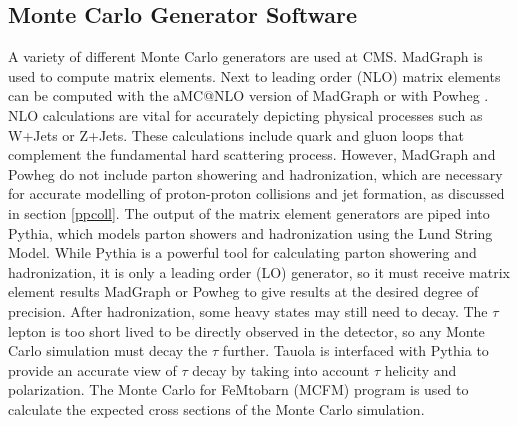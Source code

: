 \documentclass[oneside, letterpaper, oldfontcommands]{memoir}
\begin{document}

\subsection{Monte Carlo Generator Software}\label{mcsoftware}

\qquad A variety of different Monte Carlo generators are used at CMS. {\sc MadGraph} \cite{Alwall:2014hca} is used to compute matrix elements. Next to leading order (NLO) matrix elements can be computed with the aMC@NLO\cite{Alwall:2014hca} version of {\sc MadGraph} or with {\sc Powheg}\cite{Alioli:2010xd} \cite{Frixione:2007vw} \cite{Nason:2004rx}. NLO calculations are vital for accurately depicting physical processes such as W+Jets or Z+Jets. These calculations include quark and gluon loops that complement the fundamental hard scattering process. However, {\sc MadGraph} and {\sc Powheg} do not include parton showering and hadronization, which are necessary for accurate modelling of proton-proton collisions and jet formation, as discussed in section \ref{ppcoll}. The output of the matrix element generators are piped into {\sc Pythia}, which models parton showers and hadronization using the Lund String Model. While {\sc Pythia} is a powerful tool for calculating parton showering and hadronization, it is only a leading order (LO) generator, so it must receive matrix element results {\sc MadGraph} or {\sc Powheg} to give results at the desired degree of precision. After hadronization, some heavy states may still need to decay. The $\tau$ lepton is too short lived to be directly observed in the detector, so any Monte Carlo simulation must decay the $\tau$ further. 
{\sc Tauola} \cite{Was:2011tv} is interfaced with {\sc Pythia} to provide an accurate view of $\tau$ decay by taking into account $\tau$ helicity and polarization. The Monte Carlo for FeMtobarn (MCFM) program \cite{Campbell:1999ah}\cite{Campbell:2011bn}\cite{Campbell:2015qma} is used to calculate the expected cross sections of the Monte Carlo simulation. 
\end{document}
